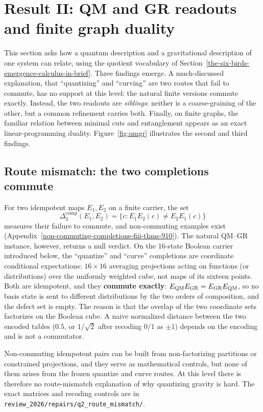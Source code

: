 \section{Result II: QM and GR readouts and finite graph duality}\label{result-ii-quantum-mechanics-general-relativity-as-a-common-refinement-a-unification}

This section asks how a quantum description and a gravitational description of one system can relate, using the
quotient vocabulary of Section~\ref{the-six-birds-emergence-calculus-in-brief}. Three findings emerge. A
much-discussed explanation, that ``quantizing'' and ``curving'' are two routes that fail to commute, has no support at
this level: the natural finite versions commute exactly. Instead, the two readouts are \emph{siblings}: neither is a
coarse-graining of the other, but a common refinement carries both. Finally, on finite graphs, the familiar relation
between minimal cuts and entanglement appears as an exact linear-programming duality. Figure~\ref{fig:qmgr} illustrates
the second and third findings.

\subsection{Route mismatch: the two completions commute}\label{locating-the-obstruction-the-route-mismatch}

For two idempotent maps \(E_1,E_2\) on a finite carrier, the set
\[
\Delta_3^{\mathrm{comp}}(E_1,E_2)=\{c:E_1E_2(c)\ne E_2E_1(c)\}
\]
measures their failure to commute, and non-commuting examples exist
(Appendix~\ref{non-commuting-completions-fiii-thms-910}). The natural QM--GR instance, however, returns a null verdict.
On the \(16\)-state Boolean carrier introduced below, the ``quantize'' and ``curve'' completions are coordinate
conditional expectations: \(16\times16\) averaging projections acting on functions (or distributions) over the
uniformly weighted cube, not maps of its sixteen points. Both are idempotent, and they \textbf{commute exactly}:
\(E_{\rm QM}E_{\rm GR}=E_{\rm GR}E_{\rm QM}\), so no basis state is sent to different distributions by the two orders
of composition, and the defect set is empty. The reason is that the overlap of the two
coordinate sets factorizes on the Boolean cube. A naive normalized distance between the two encoded tables
(\(0.5\), or \(1/\sqrt2\) after recoding \(0/1\) as \(\pm1\)) depends on the encoding and is not a commutator.

Non-commuting idempotent pairs can be built from non-factorizing partitions or constrained projections, and they serve
as mathematical controls, but none of them arises from the frozen quantize and curve routes. At this level there is
therefore no route-mismatch explanation of why quantizing gravity is hard. The exact matrices and recoding controls are
in \nolinkurl{review_2026/repairs/q2_route_mismatch/}.

